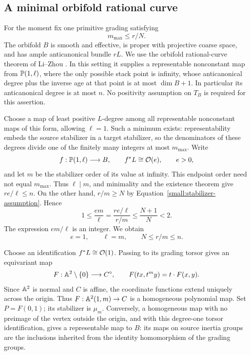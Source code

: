 \subsection{A minimal orbifold rational curve}

For the moment fix one primitive grading satisfying
\begin{equation}
 m_{\max}\leq r/N.
 \label{small:stabilizer-assumption}
\end{equation}
The orbifold \(B\) is smooth and effective, is proper with projective
coarse space, and has ample anticanonical bundle \(rL\).  We use the
orbifold rational-curve theorem of Li--Zhou
\cite[Proposition~2.6]{LZ25}.  In this setting it supplies a
representable nonconstant map from \(\mathbb P(1,\ell)\), where the only
possible stack point is infinity, whose anticanonical degree plus the
inverse age at that point is at most \(\dim B+1\).  In particular its
anticanonical degree is at most \(n\).  No positivity assumption on
\(T_B\) is required for this assertion.

Choose a map of least positive \(L\)-degree among all representable
nonconstant maps of this form, allowing \(\ell=1\).  Such a minimum
exists: representability embeds the source stabilizer in a target
stabilizer, so the denominators of these degrees divide one of the
finitely many integers at most \(m_{\max}\).  Write
\[
 f:\mathbb P(1,\ell)\longrightarrow B,
 \qquad f^*L\cong\mathcal O(e),\qquad e>0,
\]
and let \(m\) be the stabilizer order of its value at infinity.
This endpoint order need not equal \(m_{\max}\).  Thus
\(\ell\mid m\), and minimality and the existence theorem give
\(re/\ell\leq n\).  On the other hand,
\(r/m\geq N\) by Equation~\eqref{small:stabilizer-assumption}.  Hence
\begin{equation}
 1\leq\frac{em}{\ell}
 =\frac{re/\ell}{r/m}
 \leq\frac{N+1}{N}<2.
 \label{small:primitive-curve-degree}
\end{equation}
The expression \(em/\ell\) is an integer.  We obtain
\begin{equation}
 e=1,\qquad \ell=m,
 \qquad N\leq r/m\leq n.
 \label{small:curve-range}
\end{equation}

Choose an identification \(f^*L\cong\mathcal O(1)\).  Passing to its grading
torsor gives an equivariant map
\[
 F:\mathbb A^2\setminus\{0\}\longrightarrow C^\circ,
 \qquad F(t x,t^m y)=t\cdot F(x,y).
\]
Since \(\mathbb A^2\) is normal and \(C\) is affine, the coordinate functions
extend uniquely across the origin.  Thus \(F:\mathbb A^2(1,m)\to C\) is a
homogeneous polynomial map.  Set \(P=F(0,1)\); its stabilizer is
\(\mu_m\).  Conversely, a homogeneous map with no preimage of the
vertex outside the origin, and with this degree-one torsor
identification, gives a representable map to \(B\): its maps on source
inertia groups are the inclusions inherited from the identity
homomorphism of the grading groups.

